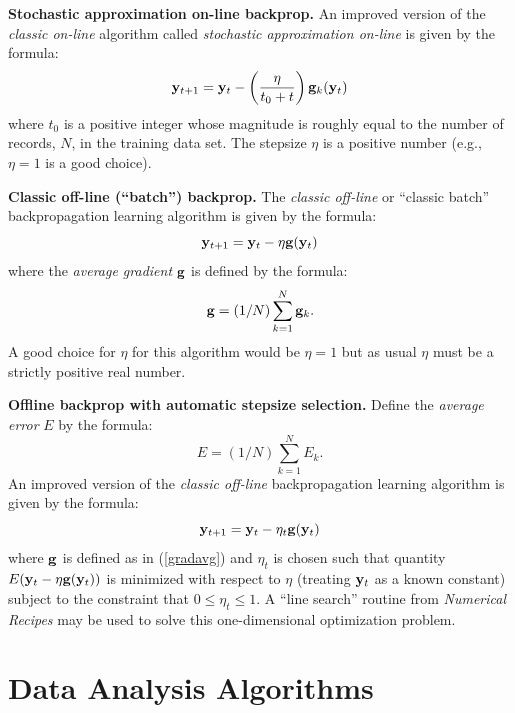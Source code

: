 \documentclass{report}
\begin{document}
{\bf Stochastic approximation on-line backprop.}
An improved version of the {\em classic on-line} algorithm called {\em
stochastic approximation on-line} is given by the formula:
\begin{equation}
{\bf y}_{t+1} = {\bf y}_t -
\left(\frac{\eta}{t_0+t} \right) {\bf g}_k({\bf y}_t)
\end{equation}
where $t_0$ is a positive integer whose magnitude is roughly equal to
the number of records, $N$, in the training data set.  The stepsize
$\eta$ is a positive number (e.g., $\eta = 1$ is a good choice).

{\bf Classic off-line (``batch'') backprop.}\label{batchepochdef}
The {\em classic off-line} or ``classic batch'' backpropagation
learning algorithm is given by the formula:
\begin{equation}
{\bf y}_{t+1} = {\bf y}_t - \eta {\bf g}({\bf y}_t)
\end{equation}
where the {\em average gradient} ${\bf g}$ is defined by the formula:
\begin{equation}
\label{gradavg}
{\bf g} = (1/N) \sum_{k=1}^N {\bf g}_k.
\end{equation}
A good choice for $\eta$ for this algorithm would be $\eta = 1$ but as
usual $\eta$ must be a strictly positive real number.

{\bf Offline backprop with automatic stepsize selection.}
Define the {\em average error} $E$ by the formula:
\begin{equation}
\label{erroravg}
E = (1/N) \sum_{k=1}^N E_k.
\end{equation}
An improved version of the {\em classic off-line} backpropagation
learning algorithm is given by the formula:
\begin{equation}
{\bf y}_{t+1} = {\bf y}_t - \eta_t {\bf g}({\bf y}_t)
\end{equation}
where ${\bf g}$ is defined as in (\ref{gradavg}) and $\eta_t$ is
chosen such that quantity $E({\bf y}_t - \eta {\bf g}({\bf y}_t))$ is
minimized with respect to $\eta$ (treating ${\bf y}_t$ as a known
constant) subject to the constraint that $0 \leq \eta_t \leq 1$.  A
``line search'' routine from {\em Numerical Recipes} may be used to
solve this one-dimensional optimization problem.

\section{Data Analysis Algorithms}
\end{document}
